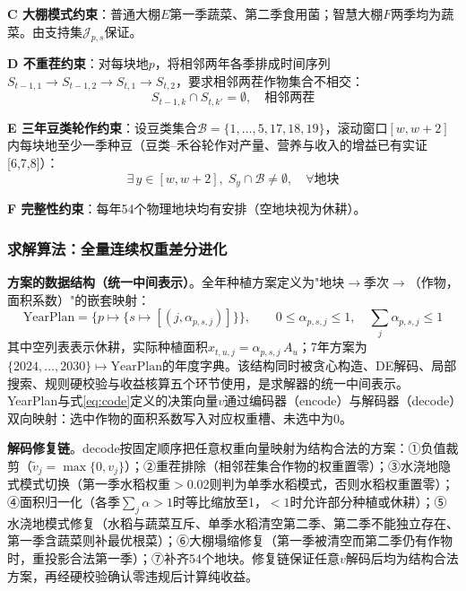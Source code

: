\documentclass[12pt,a4paper]{article}
\begin{document}
\textbf{C 大棚模式约束}：普通大棚$E$第一季蔬菜、第二季食用菌；智慧大棚$F$两季均为蔬菜。由支持集$\mathcal{J}_{p,s}$保证。

\textbf{D 不重茬约束}：对每块地$p$，将相邻两年各季排成时间序列$S_{t-1,1}\to S_{t-1,2}\to S_{t,1}\to S_{t,2}$，要求相邻两茬作物集合不相交：
\begin{equation}
S_{t-1,k}\cap S_{t,k'}=\emptyset,\quad \text{相邻两茬}
\label{eq:replant}
\end{equation}

\textbf{E 三年豆类轮作约束}：设豆类集合$\mathcal{B}=\{1,\ldots,5,17,18,19\}$，滚动窗口$[w,w+2]$内每块地至少一季种豆（豆类--禾谷轮作对产量、营养与收入的增益已有实证[6,7,8]）：
\begin{equation}
\exists\,y\in[w,w+2],\; S_y\cap\mathcal{B}\neq\emptyset,\quad \forall\text{地块}
\label{eq:bean}
\end{equation}

\textbf{F 完整性约束}：每年54个物理地块均有安排（空地块视为休耕）。

\subsubsection{求解算法：全量连续权重差分进化}

\noindent\textbf{方案的数据结构（统一中间表示）}。全年种植方案定义为"地块$\to$季次$\to$（作物，面积系数）"的嵌套映射：
\begin{equation}
\text{YearPlan}=\big\{p\mapsto\{s\mapsto[(j,\alpha_{p,s,j})]\}\big\},\qquad
0\le\alpha_{p,s,j}\le1,\quad\sum_{j}\alpha_{p,s,j}\le1
\label{eq:planstruct}
\end{equation}
其中空列表表示休耕，实际种植面积$x_{t,u,j}=\alpha_{p,s,j}\,A_u$；7年方案为$\{2024,\ldots,2030\}\mapsto\text{YearPlan}$的年度字典。该结构同时被贪心构造、DE解码、局部搜索、规则硬校验与收益核算五个环节使用，是求解器的统一中间表示。YearPlan与式\eqref{eq:code}定义的决策向量$v$通过编码器（encode）与解码器（decode）双向映射：选中作物的面积系数写入对应权重槽、未选中为0。

\noindent\textbf{解码修复链}。decode按固定顺序把任意权重向量映射为结构合法的方案：①负值裁剪（$\tilde v_j=\max\{0,v_j\}$）；②重茬排除（相邻茬集合作物的权重置零）；③水浇地隐式模式切换（第一季水稻权重$>$0.02则判为单季水稻模式，否则水稻权重置零）；④面积归一化（各季$\sum_j\alpha>1$时等比缩放至1，$<1$时允许部分种植或休耕）；⑤水浇地模式修复（水稻与蔬菜互斥、单季水稻清空第二季、第二季不能独立存在、第一季含蔬菜则补最优根菜）；⑥大棚塌缩修复（第一季被清空而第二季仍有作物时，重投影合法第一季）；⑦补齐54个地块。修复链保证任意$v$解码后均为结构合法方案，再经硬校验确认零违规后计算纯收益。
\end{document}
